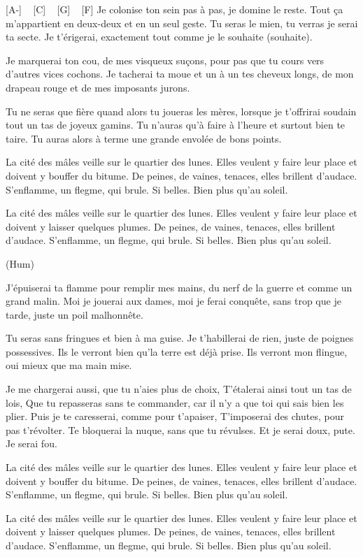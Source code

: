 [A-] ~ [C] ~ [G] ~ [F]
Je colonise ton sein pas à pas, je domine le reste.
Tout ça m'appartient en deux-deux et en un seul geste.
Tu seras le mien, tu verras je serai ta secte.
Je t'érigerai, exactement tout comme je le souhaite (souhaite).

Je marquerai ton cou, de mes visqueux suçons,
pour pas que tu cours vers d'autres vices cochons.
Je tacherai ta moue et un à un tes cheveux longs,
de mon drapeau rouge et de mes imposants jurons.

Tu ne seras que fière quand alors tu joueras les mères,
lorsque je t'offrirai soudain tout un tas de joyeux gamins.
Tu n'auras qu'à faire à l'heure et surtout bien te taire.
Tu auras alors à terme une grande envolée de bons points.


La cité des mâles veille sur le quartier des lunes.
Elles veulent y faire leur place et doivent y bouffer du bitume.
De peines, de vaines, tenaces, elles brillent d'audace.
S'enflamme, un flegme, qui brule. Si belles.
Bien plus qu'au soleil.

La cité des mâles veille sur le quartier des lunes.
Elles veulent y faire leur place et doivent y laisser quelques plumes.
De peines, de vaines, tenaces, elles brillent d'audace.
S'enflamme, un flegme, qui brule. Si belles.
Bien plus qu'au soleil.


(Hum)

J'épuiserai ta flamme pour remplir mes mains,
du nerf de la guerre et comme un grand malin.
Moi je jouerai aux dames, moi je ferai conquête,
sans trop que je tarde, juste un poil malhonnête.

Tu seras sans fringues et bien à ma guise.
Je t'habillerai de rien, juste de poignes possessives.
Ils le verront bien qu’la terre est déjà prise.
Ils verront mon flingue, oui mieux que ma main mise.


Je me chargerai aussi, que tu n'aies plus de choix,
T'étalerai ainsi tout un tas de lois,
Que tu repasseras sans te commander,
car il n'y a que toi qui sais bien les plier.
Puis je te caresserai, comme pour t'apaiser,
T'imposerai des chutes, pour pas t’révolter.
Te bloquerai la nuque, sans que tu révulses.
Et je serai doux, pute. Je serai fou.

La cité des mâles veille sur le quartier des lunes.
Elles veulent y faire leur place et doivent y bouffer du bitume.
De peines, de vaines, tenaces, elles brillent d'audace.
S'enflamme, un flegme, qui brule. Si belles.
Bien plus qu'au soleil.


La cité des mâles veille sur le quartier des lunes.
Elles veulent y faire leur place et doivent y laisser quelques plumes.
De peines, de vaines, tenaces, elles brillent d'audace.
S'enflamme, un flegme, qui brule. Si belles.
Bien plus qu'au soleil.

